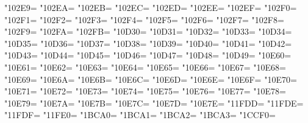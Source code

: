 \XeTeXcharclass"102E9=\KclassNum
\XeTeXcharclass"102EA=\KclassNum
\XeTeXcharclass"102EB=\KclassNum
\XeTeXcharclass"102EC=\KclassNum
\XeTeXcharclass"102ED=\KclassNum
\XeTeXcharclass"102EE=\KclassNum
\XeTeXcharclass"102EF=\KclassNum
\XeTeXcharclass"102F0=\KclassNum
\XeTeXcharclass"102F1=\KclassNum
\XeTeXcharclass"102F2=\KclassNum
\XeTeXcharclass"102F3=\KclassNum
\XeTeXcharclass"102F4=\KclassNum
\XeTeXcharclass"102F5=\KclassNum
\XeTeXcharclass"102F6=\KclassNum
\XeTeXcharclass"102F7=\KclassNum
\XeTeXcharclass"102F8=\KclassNum
\XeTeXcharclass"102F9=\KclassNum
\XeTeXcharclass"102FA=\KclassNum
\XeTeXcharclass"102FB=\KclassNum
\XeTeXcharclass"10D30=\KclassNum
\XeTeXcharclass"10D31=\KclassNum
\XeTeXcharclass"10D32=\KclassNum
\XeTeXcharclass"10D33=\KclassNum
\XeTeXcharclass"10D34=\KclassNum
\XeTeXcharclass"10D35=\KclassNum
\XeTeXcharclass"10D36=\KclassNum
\XeTeXcharclass"10D37=\KclassNum
\XeTeXcharclass"10D38=\KclassNum
\XeTeXcharclass"10D39=\KclassNum
\XeTeXcharclass"10D40=\KclassNum
\XeTeXcharclass"10D41=\KclassNum
\XeTeXcharclass"10D42=\KclassNum
\XeTeXcharclass"10D43=\KclassNum
\XeTeXcharclass"10D44=\KclassNum
\XeTeXcharclass"10D45=\KclassNum
\XeTeXcharclass"10D46=\KclassNum
\XeTeXcharclass"10D47=\KclassNum
\XeTeXcharclass"10D48=\KclassNum
\XeTeXcharclass"10D49=\KclassNum
\XeTeXcharclass"10E60=\KclassNum
\XeTeXcharclass"10E61=\KclassNum
\XeTeXcharclass"10E62=\KclassNum
\XeTeXcharclass"10E63=\KclassNum
\XeTeXcharclass"10E64=\KclassNum
\XeTeXcharclass"10E65=\KclassNum
\XeTeXcharclass"10E66=\KclassNum
\XeTeXcharclass"10E67=\KclassNum
\XeTeXcharclass"10E68=\KclassNum
\XeTeXcharclass"10E69=\KclassNum
\XeTeXcharclass"10E6A=\KclassNum
\XeTeXcharclass"10E6B=\KclassNum
\XeTeXcharclass"10E6C=\KclassNum
\XeTeXcharclass"10E6D=\KclassNum
\XeTeXcharclass"10E6E=\KclassNum
\XeTeXcharclass"10E6F=\KclassNum
\XeTeXcharclass"10E70=\KclassNum
\XeTeXcharclass"10E71=\KclassNum
\XeTeXcharclass"10E72=\KclassNum
\XeTeXcharclass"10E73=\KclassNum
\XeTeXcharclass"10E74=\KclassNum
\XeTeXcharclass"10E75=\KclassNum
\XeTeXcharclass"10E76=\KclassNum
\XeTeXcharclass"10E77=\KclassNum
\XeTeXcharclass"10E78=\KclassNum
\XeTeXcharclass"10E79=\KclassNum
\XeTeXcharclass"10E7A=\KclassNum
\XeTeXcharclass"10E7B=\KclassNum
\XeTeXcharclass"10E7C=\KclassNum
\XeTeXcharclass"10E7D=\KclassNum
\XeTeXcharclass"10E7E=\KclassNum
\XeTeXcharclass"11FDD=\KclassNum
\XeTeXcharclass"11FDE=\KclassNum
\XeTeXcharclass"11FDF=\KclassNum
\XeTeXcharclass"11FE0=\KclassNum
\XeTeXcharclass"1BCA0=\KclassNum
\XeTeXcharclass"1BCA1=\KclassNum
\XeTeXcharclass"1BCA2=\KclassNum
\XeTeXcharclass"1BCA3=\KclassNum
\XeTeXcharclass"1CCF0=\KclassNum
